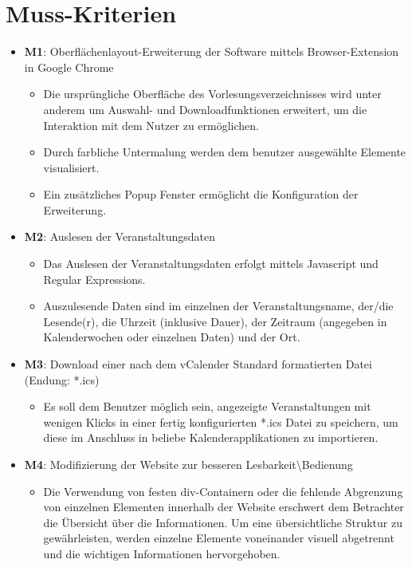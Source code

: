 \documentclass[11pt]{report}
\begin{document}
\section{Muss-Kriterien}
\begin{itemize}
\item \textbf{M1}: Oberfl\"achenlayout-Erweiterung der Software mittels Browser-Extension in Google Chrome
    \begin{itemize}
    \item Die urspr\"ungliche Oberfläche des Vorlesungsverzeichnisses wird unter anderem um Auswahl- und Downloadfunktionen erweitert, um die Interaktion mit dem Nutzer zu erm\"oglichen.
    \item Durch farbliche Untermalung werden dem benutzer ausgew\"ahlte Elemente visualisiert.
    \item Ein zus\"atzliches Popup Fenster erm\"oglicht die Konfiguration der Erweiterung.
    \end{itemize}
\item \textbf{M2}: Auslesen der Veranstaltungsdaten
    \begin{itemize}
    \item Das Auslesen der Veranstaltungsdaten erfolgt mittels Javascript und Regular Expressions.
    \item Auszulesende Daten sind im einzelnen der Veranstaltungsname, der/die Lesende(r), die Uhrzeit (inklusive Dauer), der Zeitraum (angegeben in Kalenderwochen oder einzelnen Daten) und der Ort.
    \end{itemize}
\item \textbf{M3}: Download einer nach dem vCalender Standard formatierten Datei (Endung: *.ics)
    \begin{itemize}
    \item Es soll dem Benutzer m\"oglich sein, angezeigte Veranstaltungen mit wenigen Klicks in einer fertig konfigurierten *.ics Datei zu speichern, um diese im Anschluss in beliebe Kalenderapplikationen zu importieren.
    \end{itemize}
\item \textbf{M4}: Modifizierung der Website zur besseren Lesbarkeit\textbackslash Bedienung
    \begin{itemize}
    \item Die Verwendung von festen div-Containern oder die fehlende Abgrenzung von einzelnen Elementen innerhalb der Website erschwert dem Betrachter die \"Ubersicht \"uber die Informationen. Um eine \"ubersichtliche Struktur zu gew\"ahrleisten, werden einzelne Elemente voneinander visuell abgetrennt und die wichtigen Informationen hervorgehoben.
    \end{itemize}
\end{itemize}
\end{document}
